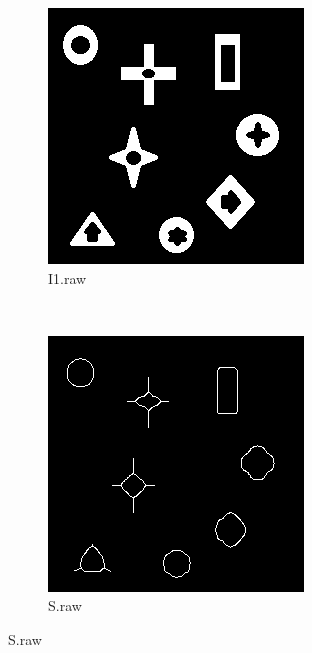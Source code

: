 \documentclass{article}
\begin{document}
\begin{enumerate}[label=(\alph*)]
        \begin{figure}[!htb]
            \centering
            \begin{subfigure}[b]{0.3\textwidth}
                \includegraphics[width=\textwidth]{img/I1.png}
                \caption{I1.raw}
            \end{subfigure}
            ~
            \begin{subfigure}[b]{0.3\textwidth}
                \includegraphics[width=\textwidth]{img/S.png}
                \caption{S.raw}
            \end{subfigure}


\end{figure}
\end{enumerate}
\end{document}
